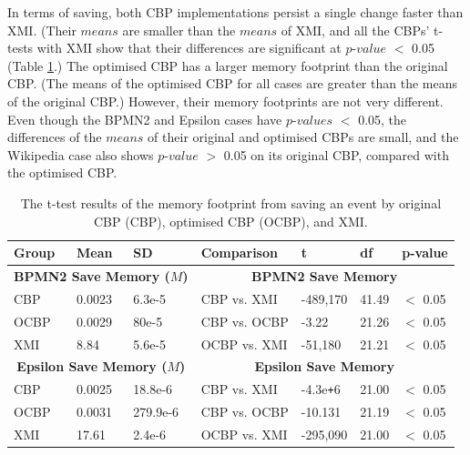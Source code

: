 {  In terms of saving, both CBP implementations persist a single change faster than XMI. (Their $means$ are smaller than the $means$ of XMI, and all the CBPs’ t-tests with XMI show that their differences are significant at $p$-$value$ $<$ 0.05 (Table \ref{table:ttest_results_save_memory}.) The optimised CBP has a larger memory footprint than the original CBP. (The means of the optimised CBP for all cases are greater than the means of the original CBP.) However, their memory footprints are not very different. Even though the BPMN2 and Epsilon cases have $p$-$values$ $<$ 0.05, the differences of the $means$ of their original and optimised CBPs are small, and the Wikipedia case also shows $p$-$value$ $>$ 0.05 on its original CBP, compared with the optimised CBP.
  
  \begin{table}[ht]
    \footnotesize
    \centering
    \caption{The t-test results of the memory footprint from saving an event by original CBP (CBP), optimised CBP (OCBP), and XMI.}
    \label{table:ttest_results_save_memory}
    \begin{tabular}
      {|p{}p{}p{}|p{}p{}p{}p{}|}
      \hline
      
      Group & Mean & SD & Comparison & t & df & p-value \\
      \hline
      \multicolumn{3}{|c|}{\textbf{BPMN2 Save Memory ($M$)}} & \multicolumn{4}{c|}{\textbf{BPMN2 Save Memory}} \\
      CBP &0.0023 & 6.3e-5 & CBP vs. XMI & -489,170 & 41.49 & $<$ 0.05 \\
      OCBP &0.0029 & 80e-5 & CBP vs. OCBP & -3.22 & 21.26 & $<$ 0.05 \\
      XMI & 8.84 & 5.6e-5 & OCBP vs. XMI & -51,180 & 21.21 & $<$ 0.05 \\
      \hline
      
      \multicolumn{3}{|c|}{\textbf{Epsilon Save Memory ($M$)}} & \multicolumn{4}{c|}{\textbf{Epsilon Save Memory}}\\
      CBP & 0.0025 & 18.8e-6 & CBP vs. XMI & -4.3e\texttt{+}6 & 21.00 & $<$ 0.05 \\
      OCBP & 0.0031 & 279.9e-6 & CBP vs. OCBP & -10.131 & 21.19 & $<$ 0.05 \\ %
      XMI & 17.61 & 2.4e-6 & OCBP vs. XMI & -295,090 &21.00 & $<$ 0.05 \\
      \hline
      

\end{tabular}
\end{table}}
